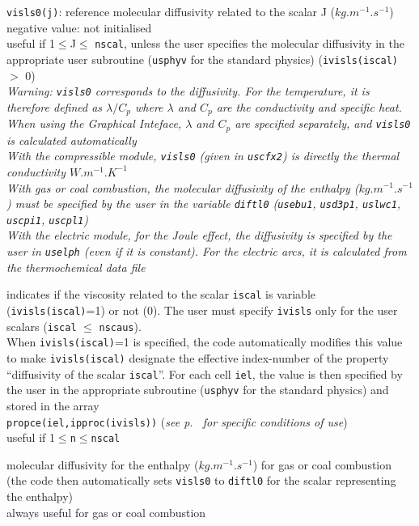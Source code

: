 {{\tt visls0(j)}: reference molecular diffusivity related to the scalar J
($kg.m^{-1}.s^{-1}$)\\
negative value: not initialised\\
useful if 1$\leqslant$J$\leqslant$ {\tt nscal}, unless the user specifies the
molecular diffusivity in the appropriate user subroutine (\texttt{usphyv} for
the standard physics) ({\tt ivisls(iscal)} $>$ 0)\\
{\em Warning: {\tt visls0} corresponds to the diffusivity. For the temperature, it is
therefore defined as $\lambda/C_p$ where $\lambda$ and $C_p$ are the
conductivity and specific heat. When using the Graphical Inteface, $\lambda$ and
$C_p$ are specified separately, and {\tt visls0} is calculated automatically\\
With the compressible module, {\tt visls0} (given in \texttt{uscfx2}) is directly the
thermal conductivity $W.m^{-1}.K^{-1}$\\
With gas or coal combustion, the molecular diffusivity of the enthalpy
($kg.m^{-1}.s^{-1}$) must be specified by the user in the variable {\tt diftl0}
(\texttt{usebu1}, \texttt{usd3p1}, \texttt{uslwc1}, \texttt{uscpi1}, \texttt{uscpl1})\\
With the electric module, for the Joule effect, the diffusivity is specified by
the user in \texttt{uselph} (even if it is constant). For the electric arcs, it
is calculated from the thermochemical data file}}

{indicates if the viscosity related to the scalar {\tt iscal} is variable
({\tt ivisls(iscal)}=1) or not (0). The user must specify {\tt ivisls} only for the
user scalars ({\tt iscal} $\leqslant$ {\tt nscaus}).\\
When {\tt ivisls(iscal)}=1 is specified, the code automatically modifies this value to
make {\tt ivisls(iscal)} designate the effective index-number of the property
``diffusivity of the scalar {\tt iscal}''. For each cell {\tt iel}, the value
is then specified by the user in the appropriate subroutine
(\texttt{usphyv} for the standard physics) and stored in the array\\
{\tt propce(iel,ipproc(ivisls))}
({\em see p.~\pageref{sec:prg_propvar} for specific conditions of use})\\
useful if 1$\leqslant${\tt n}$\leqslant${\tt nscal}}


{molecular diffusivity for the enthalpy ($kg.m^{-1}.s^{-1}$) for gas or coal
combustion (the code then automatically sets {\tt visls0} to {\tt diftl0} for the scalar
representing the enthalpy)\\
always useful for gas or coal combustion}

